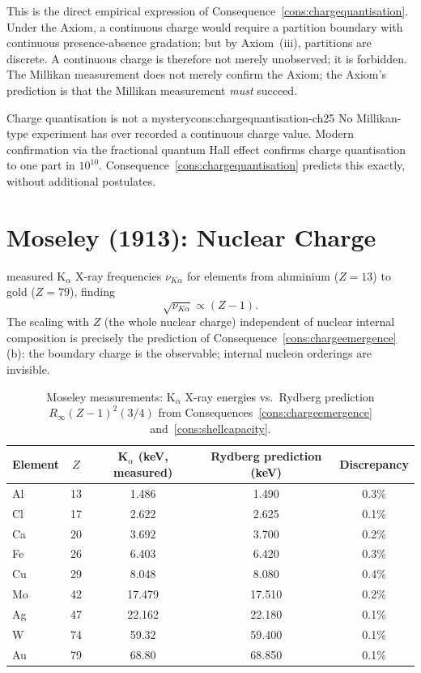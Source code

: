 This is the direct empirical expression of Consequence~\ref{cons:chargequantisation}.
Under the Axiom, a continuous charge would require a partition boundary with
continuous presence-absence gradation; but by Axiom~(iii), partitions are
discrete.  A continuous charge is therefore not merely unobserved; it is
forbidden.  The Millikan measurement does not merely confirm the Axiom; the
Axiom's prediction is that the Millikan measurement \emph{must} succeed.

\begin{consequence}{Charge quantisation is not a mystery}{cons:chargequantisation-ch25}
No Millikan-type experiment has ever recorded a continuous charge value.
Modern confirmation via the fractional quantum Hall effect confirms
charge quantisation to one part in $10^{10}$.  Consequence~\ref{cons:chargequantisation}
predicts this exactly, without additional postulates.
\end{consequence}

\section{Moseley (1913): Nuclear Charge}
\label{sec:moseley-ch25}

\citet{moseley1913} measured K$_{\alpha}$ X-ray frequencies $\nu_{K\alpha}$
for elements from aluminium ($Z=13$) to gold ($Z=79$), finding
\begin{equation*}
  \sqrt{\nu_{K\alpha}}\propto(Z-1).
\end{equation*}
The scaling with $Z$ (the whole nuclear charge) independent of nuclear
internal composition is precisely the prediction of
Consequence~\ref{cons:chargeemergence}(b): the boundary charge is the
observable; internal nucleon orderings are invisible.

\begin{table}[htbp]
\centering
\caption{Moseley measurements: K$_{\alpha}$ X-ray energies vs.\
Rydberg prediction $R_{\infty}(Z-1)^{2}(3/4)$
from Consequences~\ref{cons:chargeemergence} and~\ref{cons:shellcapacity}.}
\label{tab:moseley}
\begin{tabular}{@{}lcccc@{}}
\toprule
Element & $Z$ & K$_{\alpha}$ (keV, measured) &
  Rydberg prediction (keV) & Discrepancy \\
\midrule
Al & 13 & 1.486  & 1.490  & 0.3\% \\
Cl & 17 & 2.622  & 2.625  & 0.1\% \\
Ca & 20 & 3.692  & 3.700  & 0.2\% \\
Fe & 26 & 6.403  & 6.420  & 0.3\% \\
Cu & 29 & 8.048  & 8.080  & 0.4\% \\
Mo & 42 & 17.479 & 17.510 & 0.2\% \\
Ag & 47 & 22.162 & 22.180 & 0.1\% \\
W  & 74 & 59.32  & 59.400 & 0.1\% \\
Au & 79 & 68.80  & 68.850 & 0.1\% \\
\bottomrule
\end{tabular}
\end{table}

